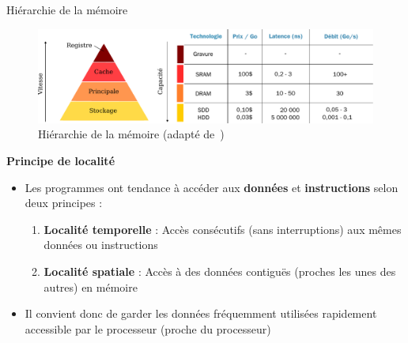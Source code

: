 \documentclass[8pt]{beamer}
\begin{document}
\begin{frame}{Hiérarchie de la mémoire}

    \begin{figure}
        \centering
        \includegraphics[width=\linewidth]{figures/hierarchy_memory.pdf}
        \caption{Hiérarchie de la mémoire (adapté de~\cite{harris2021digital})}
    \end{figure}

    \textbf{Principe de localité}
    \begin{itemize}
        \item Les programmes ont tendance à accéder aux \textbf{données} et
              \textbf{instructions} selon deux principes :
              \begin{enumerate}
                  \item \textbf{Localité temporelle} : Acc\`es consécutifs
                        (sans interruptions) aux
                        mêmes données ou instructions
                  \item \textbf{Localité spatiale} : Acc\`es à des données
                        contiguës (proches les unes des autres) en mémoire
              \end{enumerate}
        \item Il convient donc de garder les données fréquemment utilisées
              rapidement accessible par le processeur (proche du processeur)
    \end{itemize}
\end{frame}
\end{document}
